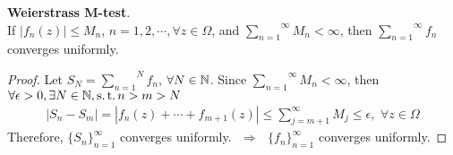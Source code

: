 \begin{proposition}\label{prop 6.2.1}
	\textbf{Weierstrass M-test}. \\
	If $\left| f_{n}(z) \right| \leq M_n$, $n = 1 , 2 , \cdots , \forall z \in \Omega$, and $\overset{\infty}{\underset{n = 1}{\sum}}{M_n} < \infty$, then $\overset{\infty}{\underset{n = 1}{\sum}}{f_n}$ converges uniformly.
	
	\vspace{2em}
	\begin{proof}
		Let $S_N = \overset{N}{\underset{n = 1}{\sum}}{f_n}$, $\forall N \in \mathbb{N}$. Since $\overset{\infty}{\underset{n = 1}{\sum}}{M_n} < \infty$, then\\
		$\forall \epsilon > 0 , \exists N \in \mathbb{N} , \operatorname{s.t.} n > m > N$
		\begin{align}
			\left| S_n - S_m \right| = \left| f_{n}(z) + \cdots + f_{m + 1}(z) \right| \leq \sum_{j = m + 1}^{\infty}{M_j} \leq \epsilon , \,\, \forall z \in \Omega
		\end{align}
		Therefore, $\{ S_n \}_{n = 1}^{\infty}$ converges uniformly. $\,\, \Rightarrow \,\,$ $\{ f_n \}_{n = 1}^{\infty}$ converges uniformly.
	\end{proof}
\end{proposition}

\vspace{2em}
